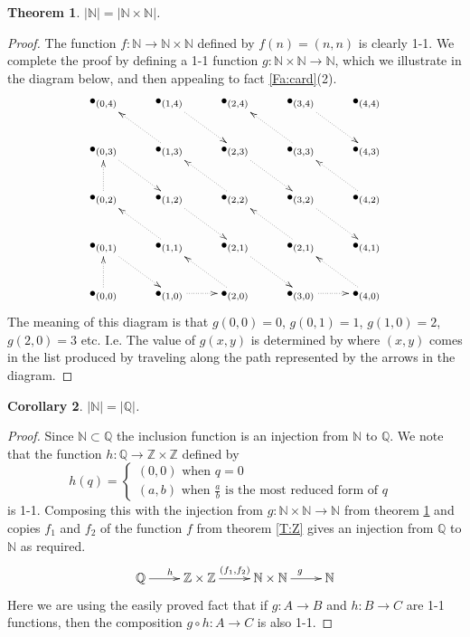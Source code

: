 \documentclass{article}
\theoremstyle{plain}
\newtheorem{theorem}{Theorem}[section]{\bfseries}{\itshape}
\newtheorem{corollary}[theorem]{Corollary}{\bfseries}{\upshape}
\newcommand{\bN}{\mathbb{N}}
\newcommand{\bZ}{\mathbb{Z}}
\newcommand{\bQ}{\mathbb{Q}}
\begin{document}
\begin{theorem}\label{T:NtimesN}
$|\bN|=|\bN\times\bN|$.
\end{theorem}
\begin{proof}
The function $f:\bN\to\bN\times\bN$ defined by $f(n)=(n,n)$ is clearly 1-1. We complete the proof by defining a 1-1 function $g:\bN\times \bN\to \bN$, which we illustrate in the diagram below, and then appealing to fact \ref{Fa:card}(2). 
\[\xymatrix{ 
\bullet_{(0,4)} & \bullet_{(1,4)}\ar@{.>}[dr] & \bullet_{(2,4)} & \bullet_{(3,4)}\ar@{.>}[dr] & \bullet_{(4,4)}\\
\bullet_{(0,3)}\ar@{.>}[dr]  & \bullet_{(1,3)}\ar@{.>}[ul] & \bullet_{(2,3)}\ar@{.>}[dr]  & \bullet_{(3,3)}\ar@{.>}[ul] & \bullet_{(4,3)} \\
\bullet_{(0,2)}\ar@{.>}[u]  & \bullet_{(1,2)}\ar@{.>}[dr]  & \bullet_{(2,2)}\ar@{.>}[ul] & \bullet_{(3,2)}\ar@{.>}[dr]  & \bullet_{(4,2)}\ar@{.>}[ul]  \\
\bullet_{(0,1)}\ar@{.>}[dr]  & \bullet_{(1,1)}\ar@{.>}[ul]  & \bullet_{(2,1)}\ar@{.>}[dr]  & \bullet_{(2,1)}\ar@{.>}[ul] & \bullet_{(4,1)} \\
\bullet_{(0,0)}\ar@{.>}[u] & \bullet_{(1,0)}\ar@{.>}[r]  & \bullet_{(2,0)}\ar@{.>}[ul] & \bullet_{(3,0)}\ar@{.>}[r]  & \bullet_{(4,0)}\ar@{.>}[ul]  }\]
The meaning of this diagram is that $g(0,0) = 0$, $g(0,1)=1$, $g(1,0) = 2$, $g(2,0) = 3$ etc. I.e. The value of $g(x,y)$ is determined by where $(x,y)$ comes in the list produced by traveling along the path represented by the arrows in the diagram. 
\end{proof}

\begin{corollary}
$|\bN|=|\bQ|$.
\end{corollary}
\begin{proof}
Since $\bN\subset\bQ$ the inclusion function is an injection from $\bN$ to $\bQ$. We note that the function $h:\bQ\to\bZ\times\bZ$ defined by 
\[h(q) = \begin{cases}
(0,0) \text{ when $q = 0$}\\
(a,b) \text{ when $\frac{a}{b}$ is the most reduced form of $q$ }
\end{cases}\]
is 1-1. Composing this with the injection from $g:\bN\times \bN\to \bN$ from theorem \ref{T:NtimesN} and copies $f_1$ and $f_2$ of the function $f$ from theorem \ref{T:Z} gives an injection from $\bQ$ to $\bN$ as required. 
\[\xymatrix{\bQ\ar[r]^h & \bZ\times \bZ\ar[r]^{(f_1,f_2)} & \bN\times \bN\ar[r]^g & \bN}\] 
Here we are using the easily proved fact that if $g:A\to B$ and $h:B\to C$ are 1-1 functions, then the composition $g\circ h:A\to C$ is also 1-1.

\end{proof}
\end{document}
